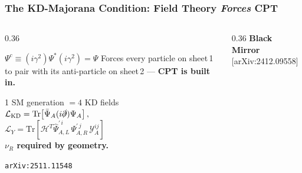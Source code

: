 \documentclass[aspectratio=169]{beamer}   %
\begin{document}
\begin{frame}
  \frametitle{The KD-Majorana Condition: Field Theory \textit{Forces} CPT}

  \begin{columns}[c]

    \begin{column}{0.36\textwidth}

      \begin{tcolorbox}[
          colback=boxbg, colframe=cptblue,
          title={\small\textbf{KD-Majorana condition}},
          fonttitle=\small, left=4pt, right=4pt, top=3pt, bottom=3pt
        ]
          $\Psi^c \equiv (i\gamma^2)\Psi^*(i\gamma^2) = \Psi$
        \small
        Forces every particle on sheet\,1
        to pair with its anti-particle
        on sheet\,2  --- \textbf{CPT is built in.}
      \end{tcolorbox}

      \vspace{0em}

      \begin{tcolorbox}[
          colback=white, colframe=cptgreen,
          title={\small\textbf{SM Unification}},
          fonttitle=\small, left=4pt, right=4pt, top=3pt, bottom=3pt
        ]
        \small
        1 SM generation $= 4$ KD fields\\[1pt]
              $\mathcal{L}_{\rm KD}=
        \mathrm{Tr}\!\left[\bar\Psi_A(i\slashed\partial)\Psi_A\right],$\\$
      \mathcal{L}_Y=
        \mathrm{Tr}\!\left[\mathcal{H}^T
        \widehat\Psi_{A,L}^{\prime\,i}\,\Psi_{A,R}^{\prime\,j}\,
        \mathcal{Y}_A^{ij}\right]$\\[1pt]
        \textbf{$\nu_R$ required by geometry.}
      \end{tcolorbox}

      \vspace{0em}
      \centering
      \footnotesize\texttt{arXiv:2511.11548}

    \end{column}

    \begin{column}{0.36\textwidth}
      \centering
      \textbf{\color{cptred}Black Mirror}
      {\footnotesize [arXiv:2412.09558]}


\end{column}
\end{columns}
\end{frame}
\end{document}
